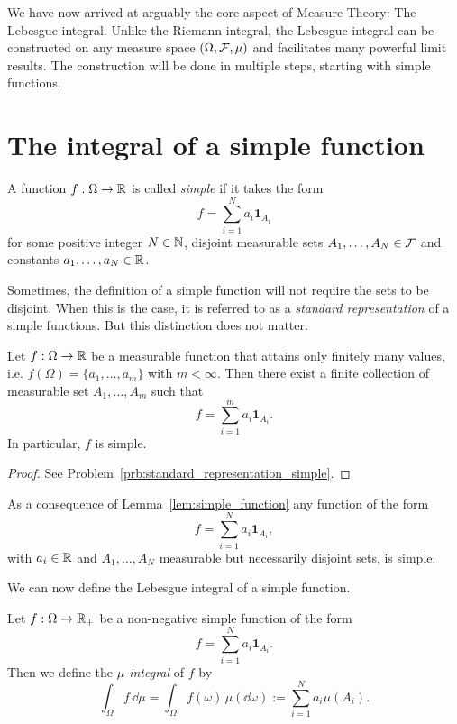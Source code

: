 We have now arrived at arguably the core aspect of Measure Theory: The Lebesgue integral. Unlike the Riemann integral, the Lebesgue integral can be constructed on any measure space $(\Omega,\mathcal F,\mu)$ and facilitates many powerful limit results. The construction will be done in multiple steps, starting with simple functions.

\section{The integral of a simple function}\label{sec:integral_simple_functions}

\begin{definition}\label{def:simple_function}
A function $f: \Omega \to \mathbb R$ is called \emph{simple} if it takes the form
\[
f = \sum_{i=1}^N a_i \mathbf{1}_{A_i}
\]
for some positive integer $N \in \mathbb N$, disjoint measurable sets $A_1, \ldots, A_N \in \mathcal F$ and constants $a_1, \dots, a_N  \in \mathbb R$.
\end{definition}

Sometimes, the definition of a simple function will not require the sets to be disjoint. When this is the case, it is referred to as a \emph{standard representation} of a simple functions. But this distinction does not matter.

\begin{lemma}\label{lem:simple_function}
Let $f: \Omega \to \mathbb R$ be a measurable function that attains only finitely many values, i.e. $f(\Omega) = \{a_1, \dots, a_m\}$ with $m < \infty$. Then there exist a finite collection of measurable set $A_1, \dots, A_m$ such that 
\[
	f = \sum_{i = 1}^m a_i \mathbf{1}_{A_i}.
\]
In particular, $f$ is simple.
\end{lemma}

\begin{proof}
See Problem~\ref{prb:standard_representation_simple}.
\end{proof}

As a consequence of Lemma~\ref{lem:simple_function} any function of the form
\[
	f = \sum_{i=1}^N a_i \mathbf{1}_{A_i},
\]
with $a_i \in \mathbb R$ and $A_1, \dots, A_N$ measurable but necessarily disjoint sets, is simple. 

We can now define the Lebesgue integral of a simple function.

\begin{definition}\label{def:Lebesgue_integral_simple}
Let $f: \Omega \to \mathbb R_+$ be a non-negative simple function of the form
\[
	f = \sum_{i=1}^N a_i \mathbf{1}_{A_i}.
\] 
Then we define the \emph{$\mu$-integral} of $f$ by
\[
	\int_\Omega f\, \dd \mu = \int_\Omega f(\omega)\,\mu(\dd\omega) := \sum_{i = 1}^N a_i \mu(A_i).
\]
\end{definition}

